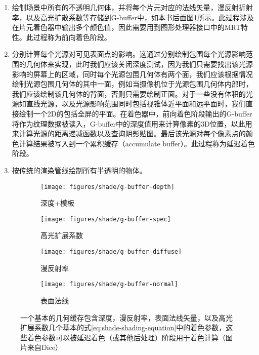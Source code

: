 \begin{enumerate}
	\item 绘制场景中所有的不透明几何体，并将每个片元对应的法线矢量，漫反射折射率，以及高光扩散系数等存储到G-buffer中，如本书后面图\ref{f:shade-g-buffer}所示。此过程涉及在片元着色器中输出多个颜色值，因此需要用到图形处理器接口中的MRT特性。此过程称为前向着色阶段。
	\item 分别计算每个光源对可见表面点的影响。这通过分别绘制包围每个光源影响范围的几何体来实现，此时我们应该关闭深度测试，因为我们只需要找出该光源影响的屏幕上的区域，同时每个光源包围几何体有两个面，我们应该根据情况绘制光源包围几何体的其中一面，例如当摄像机位于光源包围几何体内部时，我们应该绘制该几何体的背面，否则只需要绘制正面。对于一些没有体积的光源如直线光源，以及光源影响范围同时包括视锥体近平面和远平面时，我们直接绘制一个2D的包括全屏的平面。在着色器中，前向着色阶段输出的G-buffer将作为纹理数据被读入，G-buffer中的深度值用来计算像素的3D位置，以此用来计算光源的距离递减函数以及查询阴影贴图。最后该光源对每个像素点的颜色计算结果被写入到一个累积缓存（accumulate buffer）。此过程称为延迟着色阶段。
	\item 按传统的渲染管线绘制所有半透明的物体。
\end{enumerate}

\begin{figure}
\begin{fullwidth}
	\begin{subfigure}[b]{0.24\thewidth}
		\texttt{[image: figures/shade/g-buffer-depth]}
		\caption{深度+模板}
	\end{subfigure}
	\begin{subfigure}[b]{0.24\thewidth}
		\texttt{[image: figures/shade/g-buffer-spec]}
		\caption{高光扩展系数}
	\end{subfigure}
	\begin{subfigure}[b]{0.24\thewidth}
		\texttt{[image: figures/shade/g-buffer-diffuse]}
		\caption{漫反射率}
	\end{subfigure}
	\begin{subfigure}[b]{0.24\thewidth}
		\texttt{[image: figures/shade/g-buffer-normal]}
		\caption{表面法线}
	\end{subfigure}
\caption{一个基本的几何缓存包含深度，漫反射率，表面法线矢量，以及高光扩展系数几个基本的式\ref{eq:shade-shading-equation}中的着色参数，这些着色参数可以被延迟着色（或其他后处理）阶段用于着色计算（图片来自Dice）}
\label{f:shade-g-buffer} %
\end{fullwidth}
\end{figure}

